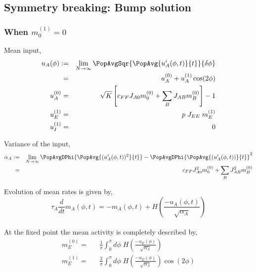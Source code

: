 \subsection{Symmetry breaking: Bump solution} 

\subsubsection{When  $m_0^{(1)} = 0$}

Mean input, \\
\begin{eqnarray}
u_A(\phi) :=&& \lim_{N \rightarrow \infty} \PopAvgSqr{\PopAvg{u_A^i(\phi, t)}{t}}{\delta \phi}\nonumber \\
=&& u_A^{(0)} + u_A^{(1)} \cos(2 \phi)  \\
u_A^{(0)} =&& \sqrt{K} \left[c_{FF} J_{A0} m_0^{(0)} + \sum_B J_{AB} m_B^{(0)} \right] - 1\label{ue0equation} \\
u_E^{(1)} =&& p \; J_{EE}\; m_E^{(1)} \label{ue1} \\
u_I^{(1)} =&& 0 \label{ui1}
\end{eqnarray}

Variance of the input,\\
\begin{eqnarray}
\alpha_A :=&& \lim_{N \rightarrow \infty} \PopAvgDPhi{\PopAvg{(u_A^i(\phi, t))^2}{t}} - \PopAvgDPhi{\PopAvg{(u_A^i(\phi, t))}{t}}^2\nonumber  \\
=&& c_{FF} J_{A0}^2 m_0^{(0)} + \sum_B J_{AB}^2 m_B^{(0)} \label{alphaE}
\end{eqnarray}

Evolution of mean rates is given by,\\
\begin{equation}
\tau_A \frac{d}{dt} m_A(\phi, t) = -m_A(\phi, t) + H\left( \frac{-u_A(\phi, t)}{\sqrt{\alpha_A}} \right)
\end{equation}
\\

At the fixed point the mean activity is completely described by, \\
\begin{eqnarray}
m_E^{(0)} =&& \frac{1}{\pi} \int_0^\pi d\phi \; H\left( \frac{-u_E(\phi)}{\sqrt{\alpha_A}} \right) \label{me0}\\
m_E^{(1)} =&& \frac{2}{\pi} \int_0^\pi d\phi \; H\left( \frac{-u_E(\phi)}{\sqrt{\alpha_A}}  \right) \cos(2 \phi) \label{me1}
\end{eqnarray}
\\


